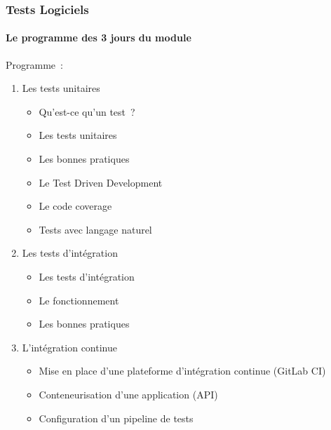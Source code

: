 \documentclass{beamer}
\begin{document}
    \begin{frame}
        \frametitle{Tests Logiciels}
        \framesubtitle{Le programme des 3 jours du module}
        \transdissolve
        Programme~:
        \begin{enumerate}
            \item Les tests unitaires
            \begin{itemize}
                \item Qu’est-ce qu’un test~?
                \item Les tests unitaires
                \item Les bonnes pratiques
                \item Le Test Driven Development
                \item Le code coverage
                \item Tests avec langage naturel
            \end{itemize}
            \item  Les tests d’intégration
            \begin{itemize}
                \item  Les tests d’intégration
                \item  Le fonctionnement
                \item  Les bonnes pratiques
            \end{itemize}
            \item L’intégration continue
            \begin{itemize}
                \item  Mise en place d’une plateforme d’intégration continue (GitLab CI)
                \item  Conteneurisation d’une application (API)
                \item  Configuration d’un pipeline de tests
            \end{itemize}
        \end{enumerate}
    \end{frame}
\end{document}
